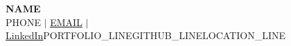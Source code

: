 \documentclass[letterpaper,11pt]{article}
\begin{document}
\begin{center}
    \textbf{\Huge \scshape {{NAME}}} \\ \vspace{4pt}
    \small
    {{PHONE}} $|$
    \href{mailto:{{EMAIL}}}{\underline{{{EMAIL}}}} $|$
    \href{{{LINKEDIN}}}{\underline{LinkedIn}}{{PORTFOLIO_LINE}}{{GITHUB_LINE}}{{LOCATION_LINE}}
\end{center}

\end{document}
